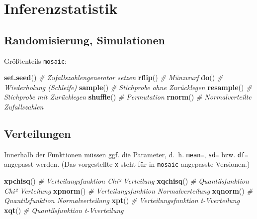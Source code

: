\documentclass[12pt,ngerman,paper=a4,pagesize,DIV=13]{scrreprt}
\newenvironment{Shaded}{\begin{snugshade}}{\end{snugshade}}
\newcommand{\CommentTok}[1]{\textcolor[rgb]{0.56,0.35,0.01}{\textit{#1}}}
\newcommand{\KeywordTok}[1]{\textcolor[rgb]{0.13,0.29,0.53}{\textbf{#1}}}
\newcommand{\NormalTok}[1]{#1}
\begin{document}
\hypertarget{inferenzstatistik}{%
\section{Inferenzstatistik}\label{inferenzstatistik}}

\hypertarget{randomisierung-simulationen}{%
\subsection{Randomisierung,
Simulationen}\label{randomisierung-simulationen}}

Größtenteils \texttt{mosaic}:

\begin{Shaded}
\begin{Highlighting}[]
\KeywordTok{set.seed}\NormalTok{() }\CommentTok{# Zufallszahlengenerator setzen}
\KeywordTok{rflip}\NormalTok{() }\CommentTok{# Münzwurf}
\KeywordTok{do}\NormalTok{() }\CommentTok{# Wiederholung (Schleife)}
\KeywordTok{sample}\NormalTok{() }\CommentTok{# Stichprobe ohne Zurücklegen}
\KeywordTok{resample}\NormalTok{() }\CommentTok{# Stichprobe mit Zurücklegen}
\KeywordTok{shuffle}\NormalTok{() }\CommentTok{# Permutation}
\KeywordTok{rnorm}\NormalTok{() }\CommentTok{# Normalverteilte Zufallszahlen}
\end{Highlighting}
\end{Shaded}

\hypertarget{verteilungen}{%
\subsection{Verteilungen}\label{verteilungen}}

Innerhalb der Funktionen müssen ggf. die Parameter, d.~h.
\texttt{mean=}, \texttt{sd=} bzw. \texttt{df=} angepasst werden. (Das
vorgestellte \texttt{x} steht für in \texttt{mosaic} angepasste
Versionen.)

\begin{Shaded}
\begin{Highlighting}[]
\KeywordTok{xpchisq}\NormalTok{() }\CommentTok{# Verteilungsfunktion Chi² Verteilung}
\KeywordTok{xqchisq}\NormalTok{() }\CommentTok{# Quantilsfunktion Chi² Verteilung}
\KeywordTok{xpnorm}\NormalTok{() }\CommentTok{# Verteilungsfunktion Normalverteilung}
\KeywordTok{xqnorm}\NormalTok{() }\CommentTok{# Quantilsfunktion Normalverteilung}
\KeywordTok{xpt}\NormalTok{() }\CommentTok{# Verteilungsfunktion t-Vverteilung}
\KeywordTok{xqt}\NormalTok{() }\CommentTok{# Quantilsfunktion t-Vverteilung}
\end{Highlighting}
\end{Shaded}
\end{document}
